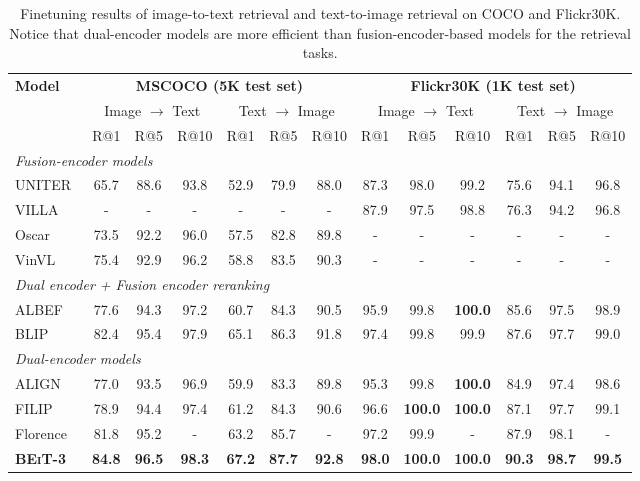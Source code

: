 \documentclass{article}
\newcommand\our{\textsc{BEiT-3}}
\begin{document}
\begin{table}[t]
\centering
\small
\begin{tabular}{@{}l@{\hskip1pt} @{\hskip1pt}c@{ \hskip1pt} @{\hskip1pt}c@{ \hskip1pt} @{\hskip1pt}c@{ \hskip1pt} @{\hskip1pt}c@{ \hskip1pt} @{\hskip1pt}c@{ \hskip1pt} @{\hskip1pt}c@{ \hskip1pt} | @{ \hskip2pt}c@{ \hskip1pt} @{\hskip1pt}c@{ \hskip1pt} @{\hskip1pt}c@{ \hskip1pt} @{\hskip1pt}c@{ \hskip1pt} @{\hskip1pt}c@{ \hskip1pt} @{\hskip1pt}c@{} }
\toprule
\multirow{3}{*}{\bf Model} & \multicolumn{6}{c}{\bf MSCOCO (5K test set)} & \multicolumn{6}{c}{\bf Flickr30K (1K test set)} \\
 & \multicolumn{3}{c}{Image $\rightarrow$ Text} & \multicolumn{3}{c}{Text $\rightarrow$ Image} & \multicolumn{3}{c}{Image $\rightarrow$ Text} & \multicolumn{3}{c}{Text $\rightarrow$ Image} \\
 \cmidrule(lr){2-4} \cmidrule(lr){5-7} \cmidrule(lr){8-10} \cmidrule(lr){11-13}
 & R@1 & R@5 & R@10 & R@1 & R@5 & R@10 & R@1 & R@5 & R@10 & R@1 & R@5 & R@10 \\
\midrule
\multicolumn{13}{l}{\textit{Fusion-encoder models}} \\
UNITER~\citep{uniter} & 65.7 & 88.6 & 93.8 & 52.9 & 79.9 & 88.0 & 87.3 & 98.0 & 99.2 & 75.6 & 94.1 & 96.8 \\
VILLA~\citep{villa} & - & - & - & - & - & - & 87.9 & 97.5 & 98.8 & 76.3 & 94.2 & 96.8 \\
Oscar~\citep{oscar} & 73.5 & 92.2 & 96.0 & 57.5 & 82.8 & 89.8 & - & - & - & - & - & - \\
VinVL~\citep{vinvl} & 75.4 & 92.9 & 96.2 & 58.8 & 83.5 & 90.3 & - & - & - & - & - & - \\
\midrule
\multicolumn{13}{l}{\textit{Dual encoder + Fusion encoder reranking}} \\
ALBEF~\citep{albef} & 77.6 & 94.3 & 97.2 & 60.7 & 84.3 & 90.5 & 95.9 & 99.8 & \bf 100.0 & 85.6 & 97.5 & 98.9 \\
BLIP~\citep{blip} & 82.4 & 95.4 & 97.9 & 65.1 & 86.3 & 91.8 & 97.4 & 99.8 & 99.9 & 87.6 & 97.7 & 99.0 \\
\midrule
\multicolumn{13}{l}{\textit{Dual-encoder models}} \\
ALIGN~\citep{align} & 77.0 & 93.5 & 96.9 & 59.9 & 83.3 & 89.8 & 95.3 & 99.8 & \bf 100.0 & 84.9 & 97.4 & 98.6 \\
FILIP~\citep{filip} & 78.9 & 94.4 & 97.4 & 61.2 & 84.3 & 90.6 & 96.6 & \bf 100.0 & \bf 100.0 & 87.1 & 97.7 & 99.1 \\
Florence~\citep{florence} & 81.8 & 95.2 & - & 63.2 & 85.7 & - & 97.2 & 99.9 & - & 87.9 & 98.1 & - \\
\bf \our{} & \bf 84.8 & \bf 96.5 & \bf 98.3 & \bf 67.2 & \bf 87.7 & \bf 92.8 & \bf 98.0 & \bf 100.0 & \bf 100.0 & \bf 90.3 & \bf 98.7 & \bf 99.5 \\
\bottomrule
\end{tabular}
\caption{
Finetuning results of image-to-text retrieval and text-to-image retrieval on COCO and Flickr30K.
Notice that dual-encoder models are more efficient than fusion-encoder-based models for the retrieval tasks.
}
\label{tbl:results:finetuned_retrieval}
\end{table}
\end{document}
